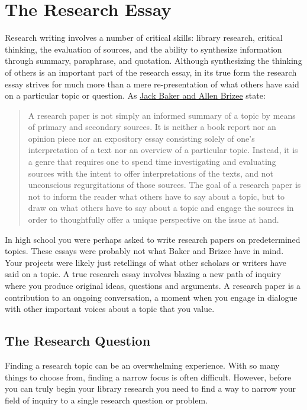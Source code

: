 
\chapter{The Research Essay}
Research writing involves a number of critical skills: library research, 
critical thinking, the evaluation of sources, and the ability to synthesize 
information through summary, paraphrase, and quotation. Although synthesizing 
the thinking of others is an important part of the research essay, in its true 
form the research essay strives for much more than a mere re-presentation of 
what others have said on a particular topic or question. As 
\href{http://owl.english.purdue.edu/owl/resource/658/02/}{Jack Baker and Allen Brizee} state:

\begin{quote}A research paper is not simply an informed summary of a topic by 
means of primary and secondary sources. It is neither a book report nor an 
opinion piece nor an expository essay consisting solely of one's interpretation 
of a text nor an overview of a particular topic. Instead, it is a genre that 
requires one to spend time investigating and evaluating sources with the intent 
to offer interpretations of the texts, and not unconscious regurgitations of 
those sources. The goal of a research paper is not to inform the reader what 
others have to say about a topic, but to draw on what others have to say about 
a topic and engage the sources in order to thoughtfully offer a unique 
perspective on the issue at hand.\end{quote}

In high school you were perhaps asked to write research papers on predetermined 
topics. These essays were probably not what Baker and Brizee have in mind. Your 
projects were likely just retellings of what other scholars or writers have 
said on a topic. A true research essay involves blazing a new path of inquiry 
where you produce original ideas, questions and arguments. A research paper is 
a contribution to an ongoing conversation, a moment when you engage in dialogue 
with other important voices about a topic that you value.

\section{The Research Question}

Finding a research topic can be an overwhelming experience. With so many things 
to choose from, finding a narrow focus is often difficult. However, before you 
can truly begin your library research you need to find a way to narrow your 
field of inquiry to a single research question or problem.


